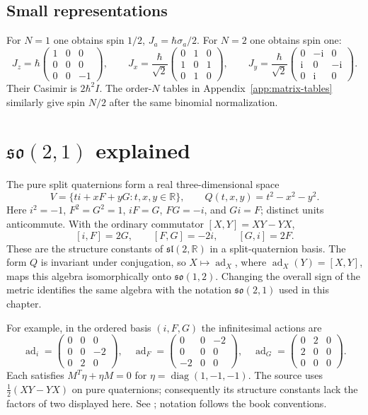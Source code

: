 \subsection{Small representations}
For $N=1$ one obtains spin $1/2$, $J_a=\hbar\sigma_a/2$. For $N=2$ one obtains spin one:
\[
J_z=\hbar\begin{pmatrix}1&0&0\\0&0&0\\0&0&-1\end{pmatrix},\qquad
J_x=\frac\hbar{\sqrt2}\begin{pmatrix}0&1&0\\1&0&1\\0&1&0\end{pmatrix},\qquad
J_y=\frac\hbar{\sqrt2}\begin{pmatrix}0&-\mathrm i&0\\\mathrm i&0&-\mathrm i\\0&\mathrm i&0\end{pmatrix}.
\]
Their Casimir is $2\hbar^2I$. The order-$N$ tables in Appendix~\ref{app:matrix-tables} similarly give spin $N/2$ after the same binomial normalization.

\section{$\mathfrak{so}(2,1)$ explained}
\label{sec:6-1}
The pure split quaternions form a real three-dimensional space
\[
V=\{ti+xF+yG:t,x,y\in\mathbb R\},\qquad Q(t,x,y)=t^2-x^2-y^2.
\]
Here $i^2=-1$, $F^2=G^2=1$, $iF=G$, $FG=-i$, and $Gi=F$;
distinct units anticommute. With the ordinary commutator $[X,Y]=XY-YX$,
\[
[i,F]=2G,\qquad [F,G]=-2i,\qquad [G,i]=2F.
\]
These are the structure constants of $\mathfrak{sl}(2,\mathbb R)$ in a
split-quaternion basis. The form $Q$ is invariant under conjugation, so
$X\mapsto\operatorname{ad}_X$, where $\operatorname{ad}_X(Y)=[X,Y]$,
maps this algebra isomorphically onto $\mathfrak{so}(1,2)$.
Changing the overall sign of the metric identifies the same algebra
with the notation $\mathfrak{so}(2,1)$ used in this chapter.

For example, in the ordered basis $(i,F,G)$ the infinitesimal actions are
\[
\operatorname{ad}_i=\begin{pmatrix}0&0&0\\0&0&-2\\0&2&0\end{pmatrix},\quad
\operatorname{ad}_F=\begin{pmatrix}0&0&-2\\0&0&0\\-2&0&0\end{pmatrix},\quad
\operatorname{ad}_G=\begin{pmatrix}0&2&0\\2&0&0\\0&0&0\end{pmatrix}.
\]
Each satisfies $M^T\eta+\eta M=0$ for $\eta=\operatorname{diag}(1,-1,-1)$.
The source uses $\tfrac12(XY-YX)$ on pure quaternions; consequently its
structure constants lack the factors of two displayed here.
See \cite[Section~7]{KocikFeynman}; notation follows the book conventions.

